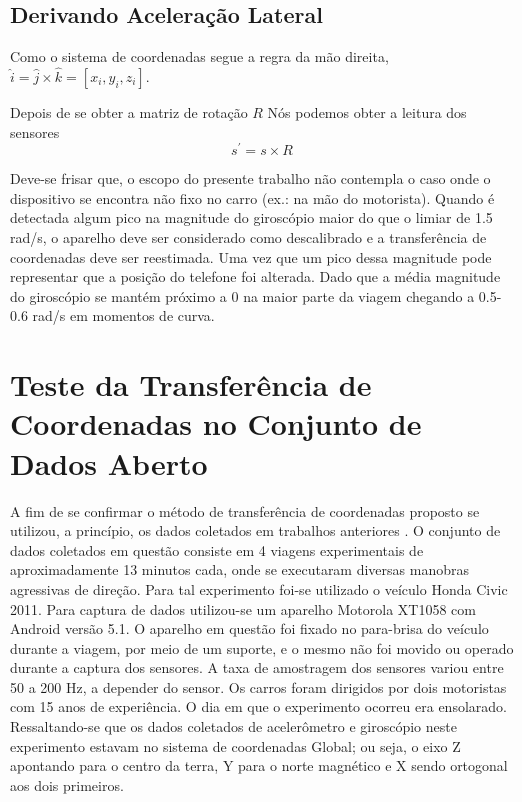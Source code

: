 \subsection{Derivando Aceleração Lateral}
Como o sistema de coordenadas segue a regra da mão direita, $\hat{i} =\hat{j} \times \hat{k} = [x_i,y_i,z_i]$.

Depois de se obter a matriz de rotação $R$ Nós podemos obter a leitura dos sensores \begin{equation}
    s^{'} = s \times R \label{eq:trocaDeBase}
\end{equation}

 Deve-se frisar que, o escopo do presente trabalho não contempla o caso onde o dispositivo se encontra não fixo no carro (ex.: na mão do motorista). Quando é detectada algum pico na magnitude do giroscópio maior do que o limiar de 1.5 rad/s, o aparelho deve ser considerado como descalibrado e a transferência de coordenadas deve ser reestimada. Uma vez que um pico dessa magnitude pode representar que a posição do telefone foi alterada. Dado que a média magnitude do giroscópio se mantém próximo a 0 na maior parte da viagem chegando a 0.5-0.6 rad/s em momentos de curva.


\section{Teste da Transferência de Coordenadas no Conjunto de Dados Aberto}
A fim de se confirmar o método de transferência de coordenadas proposto se utilizou, a princípio, os dados coletados em trabalhos anteriores \cite{junior2017driver}. O conjunto de dados coletados em questão consiste em 4 viagens experimentais de aproximadamente 13 minutos cada, onde se executaram diversas manobras agressivas de direção. Para tal experimento foi-se utilizado o veículo Honda Civic 2011. Para captura de dados utilizou-se um aparelho Motorola XT1058 com Android versão 5.1. O aparelho em questão foi fixado no para-brisa do veículo durante a viagem, por meio de um suporte, e o mesmo não foi movido ou operado durante a captura dos sensores. A taxa de amostragem dos sensores variou entre 50 a 200 Hz, a depender do sensor. Os carros foram dirigidos por dois motoristas com 15 anos de experiência. O dia em que o experimento ocorreu era ensolarado. Ressaltando-se que os dados coletados de acelerômetro e giroscópio neste experimento estavam no sistema de coordenadas Global; ou seja, o eixo Z apontando para o centro da terra, Y para o norte magnético e X sendo ortogonal aos dois primeiros.

